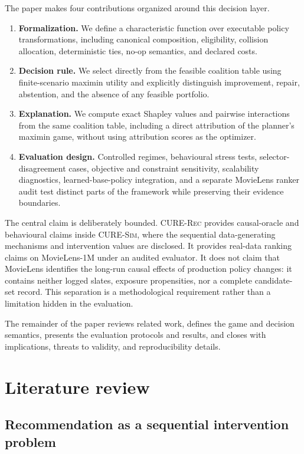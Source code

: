 \documentclass[review]{elsarticle}
\theoremstyle{plain}
\theoremstyle{definition}
\theoremstyle{remark}
\newcommand{\CURE}{\textsc{CURE-Rec}}
\newcommand{\Sim}{\textsc{CURE-Sim}}
\begin{document}
The paper makes four contributions organized around this decision layer.
\begin{enumerate}
\item \textbf{Formalization.} We define a characteristic function over executable policy transformations, including canonical composition, eligibility, collision allocation, deterministic ties, no-op semantics, and declared costs.
\item \textbf{Decision rule.} We select directly from the feasible coalition table using finite-scenario maximin utility and explicitly distinguish improvement, repair, abstention, and the absence of any feasible portfolio.
\item \textbf{Explanation.} We compute exact Shapley values and pairwise interactions from the same coalition table, including a direct attribution of the planner's maximin game, without using attribution scores as the optimizer.
\item \textbf{Evaluation design.} Controlled regimes, behavioural stress tests, selector-disagreement cases, objective and constraint sensitivity, scalability diagnostics, learned-base-policy integration, and a separate MovieLens ranker audit test distinct parts of the framework while preserving their evidence boundaries.
\end{enumerate}

The central claim is deliberately bounded. \CURE{} provides causal-oracle and behavioural claims inside \Sim{}, where the sequential data-generating mechanisms and intervention values are disclosed. It provides real-data ranking claims on MovieLens-1M under an audited evaluator. It does not claim that MovieLens identifies the long-run causal effects of production policy changes: it contains neither logged slates, exposure propensities, nor a complete candidate-set record. This separation is a methodological requirement rather than a limitation hidden in the evaluation.

The remainder of the paper reviews related work, defines the game and decision semantics, presents the evaluation protocols and results, and closes with implications, threats to validity, and reproducibility details.

\section{Literature review}\label{sec:literature}

\subsection{Recommendation as a sequential intervention problem}
\end{document}
